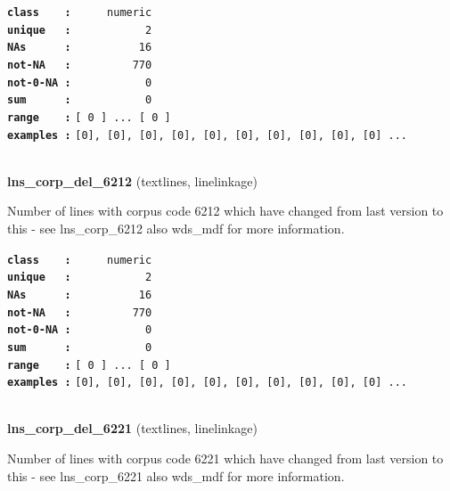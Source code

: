 \documentclass[]{article}
\begin{document}
\textbf{\texttt{class\ \ \ \ :}} \texttt{~~~~~numeric}\\
\textbf{\texttt{unique\ \ \ :}} \texttt{~~~~~~~~~~~2}\\
\textbf{\texttt{NAs\ \ \ \ \ \ :}} \texttt{~~~~~~~~~~16}\\
\textbf{\texttt{not-NA\ \ \ :}} \texttt{~~~~~~~~~770}\\
\textbf{\texttt{not-0-NA\ :}} \texttt{~~~~~~~~~~~0}\\
\textbf{\texttt{sum\ \ \ \ \ \ :}} \texttt{~~~~~~~~~~~0}\\
\textbf{\texttt{range\ \ \ \ :}}
\texttt{{[}\ 0\ {]}\ ...\ {[}\ 0\ {]}}\\
\textbf{\texttt{examples\ :}}
\texttt{{[}0{]},\ {[}0{]},\ {[}0{]},\ {[}0{]},\ {[}0{]},\ {[}0{]},\ {[}0{]},\ {[}0{]},\ {[}0{]},\ {[}0{]}\ ...}\\

~

\textbf{lns\_corp\_del\_6212} (textlines, linelinkage)

Number of lines with corpus code 6212 which have changed from last
version to this - see lns\_corp\_6212 also wds\_mdf for more
information.

\textbf{\texttt{class\ \ \ \ :}} \texttt{~~~~~numeric}\\
\textbf{\texttt{unique\ \ \ :}} \texttt{~~~~~~~~~~~2}\\
\textbf{\texttt{NAs\ \ \ \ \ \ :}} \texttt{~~~~~~~~~~16}\\
\textbf{\texttt{not-NA\ \ \ :}} \texttt{~~~~~~~~~770}\\
\textbf{\texttt{not-0-NA\ :}} \texttt{~~~~~~~~~~~0}\\
\textbf{\texttt{sum\ \ \ \ \ \ :}} \texttt{~~~~~~~~~~~0}\\
\textbf{\texttt{range\ \ \ \ :}}
\texttt{{[}\ 0\ {]}\ ...\ {[}\ 0\ {]}}\\
\textbf{\texttt{examples\ :}}
\texttt{{[}0{]},\ {[}0{]},\ {[}0{]},\ {[}0{]},\ {[}0{]},\ {[}0{]},\ {[}0{]},\ {[}0{]},\ {[}0{]},\ {[}0{]}\ ...}\\

~

\textbf{lns\_corp\_del\_6221} (textlines, linelinkage)

Number of lines with corpus code 6221 which have changed from last
version to this - see lns\_corp\_6221 also wds\_mdf for more
information.
\end{document}
